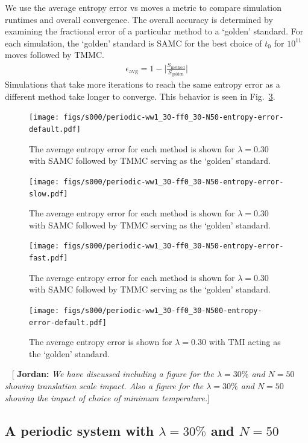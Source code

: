 \documentclass[letterpaper,twocolumn,amsmath,amssymb,pre,aps,10pt]{revtex4-1}
\newcommand{\blue}[1]{{\bf \color{blue} #1}}
\newcommand{\jpsays}[1]{{\color{red} [\blue{Jordan:} \emph{#1}]}}
\begin{document}
We use the average entropy error vs moves a metric to compare
simulation runtimes and overall convergence. The overall accuracy
is determined by examining the fractional error of a particular method to
a `golden' standard. For each simulation, the `golden' standard is
SAMC for the best choice of $t_0$ for $10^{11}$ moves followed by TMMC.
\begin{align}
\epsilon_\text{avg} = 1 - \bigg\lvert\frac{S_\text{method}}{S_\text{golden}}\bigg\rvert
\end{align}
Simulations that take more iterations to reach the same entropy error as a
different method take longer to converge. This behavior is seen in
Fig.~\ref{fig:N50-ff0.3-avg-error}.

\begin{figure}
  \texttt{[image: figs/s000/periodic-ww1\_30-ff0\_30-N50-entropy-error-default.pdf]}
  \caption{The average entropy error for each method is shown for $\lambda = 0.30$ with
  SAMC followed by TMMC serving as the `golden'
  standard.}\label{fig:N50-ff0.3-avg-error}
\end{figure}
\begin{figure}
  \texttt{[image: figs/s000/periodic-ww1\_30-ff0\_30-N50-entropy-error-slow.pdf]}
  \caption{The average entropy error for each method is shown for $\lambda = 0.30$ with
  SAMC followed by TMMC serving as the `golden'
  standard.}\label{fig:N50-ff0.3-avg-error}
\end{figure}
\begin{figure}
  \texttt{[image: figs/s000/periodic-ww1\_30-ff0\_30-N50-entropy-error-fast.pdf]}
  \caption{The average entropy error for each method is shown for $\lambda = 0.30$ with
  SAMC followed by TMMC serving as the `golden'
  standard.}\label{fig:N50-ff0.3-avg-error}
\end{figure}
\begin{figure}
\texttt{[image: figs/s000/periodic-ww1\_30-ff0\_30-N500-entropy-error-default.pdf]}
  \caption{The average entropy error is shown for $\lambda = 0.30$ with TMI acting as the
  `golden' standard.}\label{fig:n500-ff0.3}
\end{figure}

~\jpsays{We have discussed including a figure for the $\lambda = 30\%$ and $N = 50$
showing translation scale impact. Also a figure for the $\lambda = 30\%$ and $N = 50$
showing the impact of choice of minimum temperature.}

\subsection{A periodic system with $\lambda = 30\%$ and $N = 50$}
\end{document}
